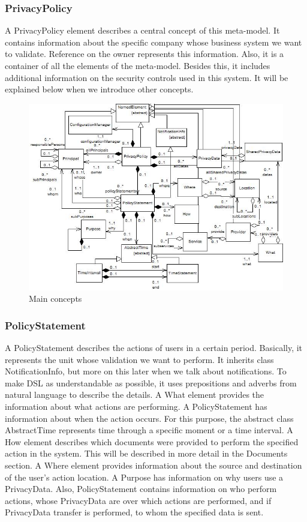 \documentclass[11pt,english]{article}
\begin{document}
\subsubsection{PrivacyPolicy}
A PrivacyPolicy element describes a central concept of this meta-model. It contains information about the specific company whose business system we want to validate. Reference on the owner represents this information. Also, it is a container of all the elements of the meta-model. Besides this, it includes additional information on the security controls used in this system. It will be explained below when we introduce other concepts.
\begin{figure}[H]
    \centering
    \includegraphics[width=12.5cm]{images/mainconcepts.jpg}
    \caption{Main concepts}
    \label{fig:mainconcepts}
\end{figure}
\subsubsection{PolicyStatement}
A PolicyStatement describes the actions of users in a certain period. Basically, it represents the unit whose validation we want to perform. It inherits class NotificationInfo, but more on this later when we talk about notifications. To make DSL as understandable as possible, it uses prepositions and adverbs from natural language to describe the details. A What element provides the information about what actions are performing. A PolicyStatement has information about when the action occurs. For this purpose, the abstract class AbstractTime represents time through a specific moment or a time interval. A How element describes which documents were provided to perform the specified action in the system. This will be described in more detail in the Documents section. A Where element provides information about the source and destination of the user's action location. A Purpose has information on why users use a PrivacyData. Also, PolicyStatement contains information on who perform actions, whose PrivacyData are over which actions are performed, and if PrivacyData transfer is performed, to whom the specified data is sent.
\end{document}
